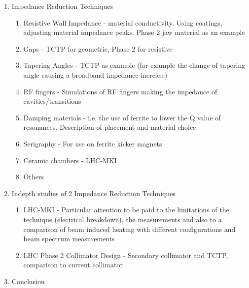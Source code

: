 \documentclass[12pt,PhD]{Thesis}
\begin{document}
\begin{enumerate}
\item{Impedance Reduction Techniques}
\begin{enumerate}
\item{Resistive Wall Impedance - material conductivity. Using coatings, adjusting material impedance peaks. Phase 2 jaw material as an example}
\item{Gaps - TCTP for geometric, Phase 2 for resistive}
\item{Tapering Angles - TCTP as example (for example the change of tapering angle causing a broadband impedance increase)}
\item{RF fingers - Simulations of RF fingers making the impedance of cavities/transitions}
\item{Damping materials - i.e. the use of ferrite to lower the Q value of resonances. Description of placement and material choice}
\item{Serigraphy - For use on ferrite kicker magnets}
\item{Ceramic chambers - LHC-MKI}
\item{Others}
\end{enumerate}
\item{Indepth studies of 2 Impedance Reduction Techniques}
\begin{enumerate}
\item{LHC-MKI - Particular attention to be paid to the limitations of the technique (electrical breakdown), the measurements and also to a comparison of beam induced heating with different configurations and beam spectrum measurements}
\item{LHC Phase 2 Collimator Design - Secondary collimator and TCTP, comparison to current collimator}
\end{enumerate}
\item{Conclusion}
\end{enumerate}
\end{document}
